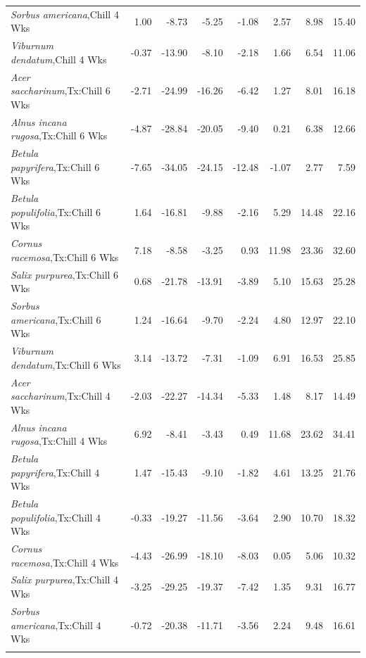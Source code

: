 \documentclass{article}\usepackage[]{graphicx}\usepackage[]{color}
\begin{document}
\begin{longtable}{lrrrrrrr}
  \textit{Sorbus americana},Chill 4 Wks & 1.00 & -8.73 & -5.25 & -1.08 & 2.57 & 8.98 & 15.40 \\ 
  \textit{Viburnum dendatum},Chill 4 Wks & -0.37 & -13.90 & -8.10 & -2.18 & 1.66 & 6.54 & 11.06 \\ 
  \textit{Acer saccharinum},Tx:Chill 6 Wks & -2.71 & -24.99 & -16.26 & -6.42 & 1.27 & 8.01 & 16.18 \\ 
  \textit{Alnus incana rugosa},Tx:Chill 6 Wks & -4.87 & -28.84 & -20.05 & -9.40 & 0.21 & 6.38 & 12.66 \\ 
  \textit{Betula papyrifera},Tx:Chill 6 Wks & -7.65 & -34.05 & -24.15 & -12.48 & -1.07 & 2.77 & 7.59 \\ 
  \textit{Betula populifolia},Tx:Chill 6 Wks & 1.64 & -16.81 & -9.88 & -2.16 & 5.29 & 14.48 & 22.16 \\ 
  \textit{Cornus racemosa},Tx:Chill 6 Wks & 7.18 & -8.58 & -3.25 & 0.93 & 11.98 & 23.36 & 32.60 \\ 
  \textit{Salix purpurea},Tx:Chill 6 Wks & 0.68 & -21.78 & -13.91 & -3.89 & 5.10 & 15.63 & 25.28 \\ 
  \textit{Sorbus americana},Tx:Chill 6 Wks & 1.24 & -16.64 & -9.70 & -2.24 & 4.80 & 12.97 & 22.10 \\ 
  \textit{Viburnum dendatum},Tx:Chill 6 Wks & 3.14 & -13.72 & -7.31 & -1.09 & 6.91 & 16.53 & 25.85 \\ 
  \textit{Acer saccharinum},Tx:Chill 4 Wks & -2.03 & -22.27 & -14.34 & -5.33 & 1.48 & 8.17 & 14.49 \\ 
  \textit{Alnus incana rugosa},Tx:Chill 4 Wks & 6.92 & -8.41 & -3.43 & 0.49 & 11.68 & 23.62 & 34.41 \\ 
  \textit{Betula papyrifera},Tx:Chill 4 Wks & 1.47 & -15.43 & -9.10 & -1.82 & 4.61 & 13.25 & 21.76 \\ 
  \textit{Betula populifolia},Tx:Chill 4 Wks & -0.33 & -19.27 & -11.56 & -3.64 & 2.90 & 10.70 & 18.32 \\ 
  \textit{Cornus racemosa},Tx:Chill 4 Wks & -4.43 & -26.99 & -18.10 & -8.03 & 0.05 & 5.06 & 10.32 \\ 
  \textit{Salix purpurea},Tx:Chill 4 Wks & -3.25 & -29.25 & -19.37 & -7.42 & 1.35 & 9.31 & 16.77 \\ 
  \textit{Sorbus americana},Tx:Chill 4 Wks & -0.72 & -20.38 & -11.71 & -3.56 & 2.24 & 9.48 & 16.61 \\ 
   \hline
\hline
\label{tab:suppmodht}
\end{longtable}
\end{document}
